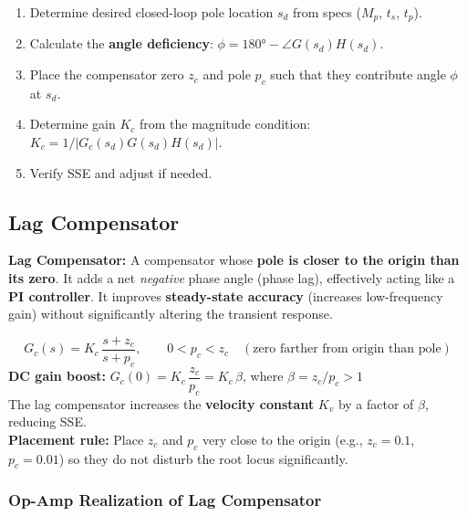 \documentclass[12pt,a4paper]{article}
\begin{document}
\begin{enumerate}[label=\textbf{Step \arabic*:}, leftmargin=2.5cm, itemsep=3pt]
  \item Determine desired closed-loop pole location $s_d$ from specs ($M_p$, $t_s$, $t_p$).
  \item Calculate the \textbf{angle deficiency}: $\phi = 180° - \angle G(s_d)H(s_d)$.
  \item Place the compensator zero $z_c$ and pole $p_c$ such that they contribute angle $\phi$ at $s_d$.
  \item Determine gain $K_c$ from the magnitude condition: $K_c = 1/|G_c(s_d)G(s_d)H(s_d)|$.
  \item Verify SSE and adjust if needed.
\end{enumerate}

\subsection{Lag Compensator}

\begin{tcolorbox}[defbox]
\textbf{Lag Compensator:} A compensator whose \textbf{pole is closer to the origin than its zero}. It adds a net \textit{negative} phase angle (phase lag), effectively acting like a \textbf{PI controller}. It improves \textbf{steady-state accuracy} (increases low-frequency gain) without significantly altering the transient response.
\end{tcolorbox}

\begin{tcolorbox}[formulabox, title={Lag Compensator Transfer Function}]
$$G_c(s) = K_c\,\frac{s + z_c}{s + p_c}, \qquad 0 < p_c < z_c \quad (\text{zero farther from origin than pole})$$
\textbf{DC gain boost:} $G_c(0) = K_c\,\dfrac{z_c}{p_c} = K_c\,\beta$, where $\beta = z_c/p_c > 1$\\[4pt]
The lag compensator increases the \textbf{velocity constant} $K_v$ by a factor of $\beta$, reducing SSE.\\[4pt]
\textbf{Placement rule:} Place $z_c$ and $p_c$ very close to the origin (e.g., $z_c = 0.1$, $p_c = 0.01$) so they do not disturb the root locus significantly.
\end{tcolorbox}

\subsubsection*{Op-Amp Realization of Lag Compensator}
\end{document}
